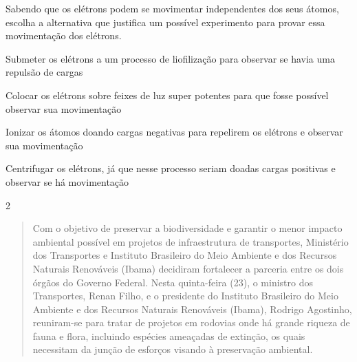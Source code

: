 Sabendo que os elétrons podem se movimentar independentes dos seus
átomos, escolha a alternativa que justifica um possível experimento para
provar essa movimentação dos elétrons.

\begin{escolha}
\item
  Submeter os elétrons a um processo de liofilização para observar se
  havia uma repulsão de cargas
\item
  Colocar os elétrons sobre feixes de luz super potentes para que fosse
  possível observar sua movimentação
\item
  Ionizar os átomos doando cargas negativas para repelirem os elétrons e
  observar sua movimentação
\item
  Centrifugar os elétrons, já que nesse processo seriam doadas cargas
  positivas e observar se há movimentação
\end{escolha}


\num{2}
\begin{quote}
Com o objetivo de preservar a biodiversidade e garantir o menor
impacto ambiental possível em projetos de infraestrutura de
transportes, Ministério dos Transportes e Instituto Brasileiro do Meio
Ambiente e dos Recursos Naturais Renováveis (Ibama) decidiram
fortalecer a parceria entre os dois órgãos do Governo Federal. Nesta
quinta-feira (23), o ministro dos Transportes, Renan Filho, e o
presidente do Instituto Brasileiro do Meio Ambiente e dos Recursos
Naturais Renováveis (Ibama), Rodrigo Agostinho, reuniram-se para
tratar de projetos em rodovias onde há grande riqueza de fauna e
flora, incluindo espécies ameaçadas de extinção, os quais necessitam
da junção de esforços visando à preservação ambiental.

\end{quote}

